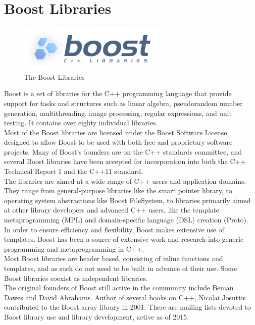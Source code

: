 \section{Boost Libraries}
\begin{figure}[H]
    \centering \includegraphics[width=0.7\linewidth]{images/boost.png}
    \caption{The Boost Libraries}
\end{figure}
Boost is a set of libraries for the C++ programming language that provide support for tasks and structures such as linear algebra, pseudorandom number generation, multithreading, image processing, regular expressions, and unit testing. It contains over eighty individual libraries.\\
Most of the Boost libraries are licensed under the Boost Software License, designed to allow Boost to be used with both free and proprietary software projects. Many of Boost's founders are on the C++ standards committee, and several Boost libraries have been accepted for incorporation into both the C++ Technical Report 1 and the C++11 standard.\\
The libraries are aimed at a wide range of C++ users and application domains. They range from general-purpose libraries like the smart pointer library, to operating system abstractions like Boost FileSystem, to libraries primarily aimed at other library developers and advanced C++ users, like the template metaprogramming (MPL) and domain-specific language (DSL) creation (Proto).\\
In order to ensure efficiency and flexibility, Boost makes extensive use of templates. Boost has been a source of extensive work and research into generic programming and metaprogramming in C++.\\
Most Boost libraries are header based, consisting of inline functions and templates, and as such do not need to be built in advance of their use. Some Boost libraries coexist as independent libraries.\\
The original founders of Boost still active in the community include Beman Dawes and David Abrahams. Author of several books on C++, Nicolai Josuttis contributed to the Boost array library in 2001. There are mailing lists devoted to Boost library use and library development, active as of 2015.
